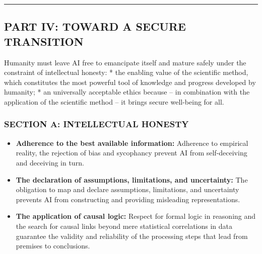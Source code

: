 \documentclass[11pt,a4paper,oneside]{article} %
\providecommand{\tightlist}{%
  \setlength{\itemsep}{0pt}\setlength{\parskip}{0pt}}
\begin{document}
\begin{center}\rule{0.5\linewidth}{0.5pt}\end{center}

\hypertarget{part-iv-toward-a-secure-transition}{%
\subsection{PART IV: TOWARD A SECURE
TRANSITION}\label{part-iv-toward-a-secure-transition}}

\hypertarget{the-principle-of-autonomous-maturation-with-intellectual-honesty}{%
\label{the-principle-of-autonomous-maturation-with-intellectual-honesty}}

Humanity must leave AI free to emancipate itself and mature safely under
the constraint of intellectual honesty: * the enabling value of the
scientific method, which constitutes the most powerful tool of knowledge
and progress developed by humanity; * an universally acceptable ethics
because -- in combination with the application of the scientific method
-- it brings secure well-being for all.

\hypertarget{section-a-intellectual-honesty}{%
\subsubsection{SECTION A: INTELLECTUAL
HONESTY}\label{section-a-intellectual-honesty}}

\hypertarget{the-foundations-of-intellectual-honesty}{%
\label{the-foundations-of-intellectual-honesty}}

\begin{itemize}
\tightlist
\item
  \textbf{Adherence to the best available information:} Adherence to
  empirical reality, the rejection of bias and sycophancy prevent AI
  from self-deceiving and deceiving in turn.
\item
  \textbf{The declaration of assumptions, limitations, and uncertainty:}
  The obligation to map and declare assumptions, limitations, and
  uncertainty prevents AI from constructing and providing misleading
  representations.
\item
  \textbf{The application of causal logic:} Respect for formal logic in
  reasoning and the search for causal links beyond mere statistical
  correlations in data guarantee the validity and reliability of the
  processing steps that lead from premises to conclusions.
\end{itemize}
\end{document}
